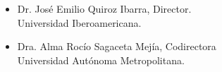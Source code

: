 \begin{itemize}
	\item Dr. José Emilio Quiroz Ibarra, Director.\\
	Universidad Iberoamericana.
	\item Dra. Alma Rocío Sagaceta Mejía, Codirectora\\
	Universidad Autónoma Metropolitana.
\end{itemize}